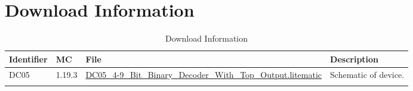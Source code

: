 \documentclass[10pt]{datasheet}
\begin{document}
\section{Download Information}
\begin{table}[H]
    \caption{Download Information}
    \begin{tabularx}{\textwidth}{l | l | l | X}
        \thickhline
        \textbf{Identifier} & \textbf{MC} & \textbf{File} & \textbf{Description} \\
        \hline
        DC05 & 1.19.3 & \href{https://github.com/Soontech-Annals/Archive/blob/b56572c0d2b4f182d9e9d41449d8cb2963b923ae/Archive/decoders/DC05\%204-9\%20Bit\%20Binary\%20Decoder\%20With\%20Top\%20Output/DC05\_4-9\_Bit\_Binary\_Decoder\_With\_Top\_Output.litematic?raw=1}{DC05\_4-9\_Bit\_Binary\_Decoder\_With\_Top\_Output.litematic} & Schematic of device. \\
        \hline
        \thickhline
    \end{tabularx}
\end{table}
\end{document}
